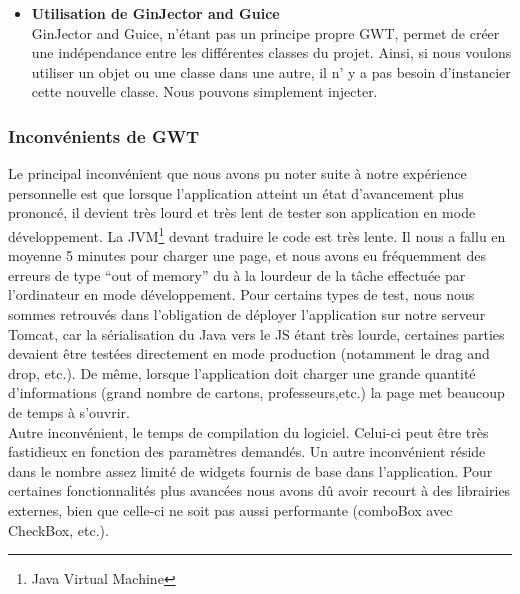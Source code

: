 \begin{itemize}
\item \textbf{Utilisation de GinJector and Guice}\\
GinJector and Guice, n'étant pas un principe propre GWT, permet de créer une indépendance entre les différentes classes du projet. Ainsi, si nous voulons utiliser un objet ou une classe dans une autre, il n' y a pas besoin d'instancier cette nouvelle classe. Nous pouvons simplement injecter.
\end{itemize}





\subsubsection{Inconvénients de GWT}
Le principal inconvénient que nous avons pu noter suite à notre expérience personnelle est que lorsque l'application atteint un état d'avancement plus prononcé, il devient très lourd et très lent de tester son application en mode développement. La JVM\footnote{Java Virtual Machine} devant traduire le code est très lente. Il nous a fallu en moyenne 5 minutes pour charger une page, et nous avons eu fréquemment des erreurs de type \enquote{out of memory} du à la lourdeur de la tâche effectuée par l'ordinateur en mode développement.
\newline
\indent
Pour certains types de test, nous nous sommes retrouvés dans l'obligation de déployer l'application sur notre serveur Tomcat, car la sérialisation du Java vers le JS étant très lourde, certaines parties devaient être testées directement en mode production (notamment le drag and drop, etc.). 
\newline
\indent
De même, lorsque l'application doit charger une grande quantité d'informations (grand nombre de cartons, professeurs,etc.) la page met beaucoup de temps à s'ouvrir.\\
\newline
\indent
Autre inconvénient, le temps de compilation du logiciel. Celui-ci peut être très fastidieux en fonction des paramètres demandés. 
\newline
\indent
Un autre inconvénient réside dans le nombre assez limité de widgets fournis de base dans l'application. Pour certaines fonctionnalités plus avancées nous avons dû avoir recourt à des librairies externes, bien que celle-ci ne soit pas aussi performante (comboBox avec CheckBox, etc.).


